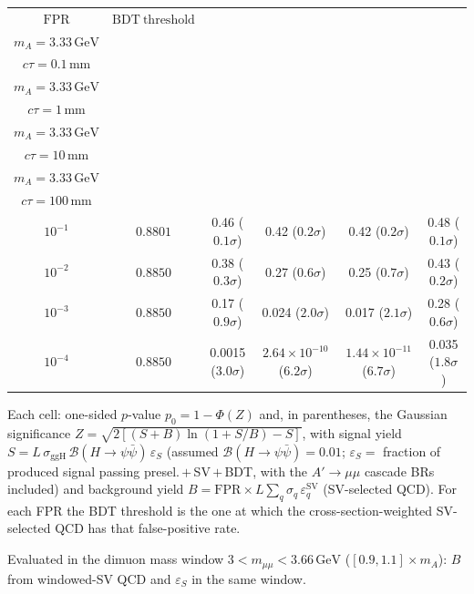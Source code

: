 \documentclass[10pt,a4paper]{article}
\begin{document}
{\begin{tabular}{cccccc}
\toprule
$\mathrm{FPR}$ & $\mathrm{BDT\ threshold}$ & \shortstack{$m_{\pi}=10\,\mathrm{GeV}$\\$m_{A}=3.33\,\mathrm{GeV}$\\$c\tau=0.1\,\mathrm{mm}$} & \shortstack{$m_{\pi}=10\,\mathrm{GeV}$\\$m_{A}=3.33\,\mathrm{GeV}$\\$c\tau=1\,\mathrm{mm}$} & \shortstack{$m_{\pi}=10\,\mathrm{GeV}$\\$m_{A}=3.33\,\mathrm{GeV}$\\$c\tau=10\,\mathrm{mm}$} & \shortstack{$m_{\pi}=10\,\mathrm{GeV}$\\$m_{A}=3.33\,\mathrm{GeV}$\\$c\tau=100\,\mathrm{mm}$} \\
\midrule
$10^{-1}$ & $0.8801$ & 0.46 ($0.1\sigma$) & 0.42 ($0.2\sigma$) & 0.42 ($0.2\sigma$) & 0.48 ($0.1\sigma$)\\
$10^{-2}$ & $0.8850$ & 0.38 ($0.3\sigma$) & 0.27 ($0.6\sigma$) & 0.25 ($0.7\sigma$) & 0.43 ($0.2\sigma$)\\
$10^{-3}$ & $0.8850$ & 0.17 ($0.9\sigma$) & 0.024 ($2.0\sigma$) & 0.017 ($2.1\sigma$) & 0.28 ($0.6\sigma$)\\
$10^{-4}$ & $0.8850$ & 0.0015 ($3.0\sigma$) & $2.64\times10^{-10}$ ($6.2\sigma$) & $1.44\times10^{-11}$ ($6.7\sigma$) & 0.035 ($1.8\sigma$)\\
\bottomrule
\end{tabular}

{\small Each cell: one-sided $p$-value $p_0=1-\Phi(Z)$ and, in parentheses, the Gaussian significance $Z=\sqrt{2\left[(S{+}B)\ln(1{+}S/B)-S\right]}$, with signal yield $S=L\,\sigma_{\mathrm{ggH}}\,\mathcal{B}(H\to\psi\bar{\psi})\,\varepsilon_S$ (assumed $\mathcal{B}(H\to\psi\bar{\psi})=0.01$; $\varepsilon_S=$ fraction of produced signal passing presel.\,$+$\,SV\,$+$\,BDT, with the $A'\to\mu\mu$ cascade BRs included) and background yield $B=\mathrm{FPR}\times L\sum_q\sigma_q\,\varepsilon_q^{\mathrm{SV}}$ (SV-selected QCD). For each FPR the BDT threshold is the one at which the cross-section-weighted SV-selected QCD has that false-positive rate.}

{\small Evaluated in the dimuon mass window $3<m_{\mu\mu}<3.66\,\mathrm{GeV}$ ($[0.9,1.1]\times m_A$): $B$ from windowed-SV QCD and $\varepsilon_S$ in the same window.}

}\clearpage
\end{document}
